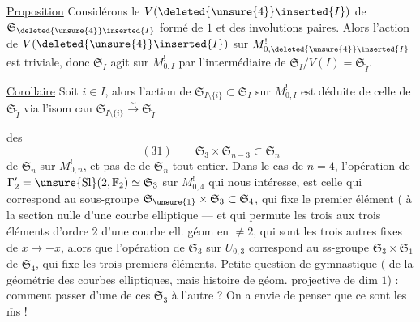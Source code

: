 \uline{Proposition} Considérons le 
$V(\deleted{\unsure{4}}\inserted{I})$ de $\mathfrak{S}_{\deleted{\unsure{4}}\inserted{I}}$ formé de $1$ et des involutions
paires. Alors l'action de $V(\deleted{\unsure{4}}\inserted{I})$ sur $M_{0,\deleted{\unsure{4}}\inserted{I}}^{!}$
est triviale,  donc  $\mathfrak{S}_I$ agit
sur $M_{0,I}^{!}$ par l'intermédiaire de
$\mathfrak{S}_I/V(I)=\mathfrak{S}_{\widetilde I}$.
\figure{[Trait vertical à gauche de la proposition, de $V(I)$ jusqu'à $\mathfrak{S}_I/V(I)=\mathfrak{S}_{\widetilde I}$.]}


\uline{Corollaire} Soit $i\in I$, alors l'action
de $\mathfrak{S}_{I\setminus\{i\}}\subset\mathfrak{S}_I$ sur $M_{0,I}^{!}$ est déduite
de celle de $\mathfrak{S}_{\widetilde I}$ via l'isom can $\mathfrak{S}_{I\setminus\{i\}}\xrightarrow{\sim}\mathfrak{S}_{\widetilde I}$

 des 
\[
 (31)\qquad \mathfrak{S}_3\times\mathfrak{S}_{n-3}\subset\mathfrak{S}_n
\]
de $\mathfrak{S}_n$ sur $M_{0,n}^{!}$, et pas de  de
$\mathfrak{S}_n$ tout entier. Dans le cas de $n=4$,
l'opération de $\Gamma'_2=\unsure{\mathrm{Sl}}(2,\mathbb{F}_2)\simeq\mathfrak{S}_3$ sur
$M_{0,4}^{!}$ qui nous intéresse, est celle qui
correspond au sous-groupe $\mathfrak{S}_{\unsure{1}}\times\mathfrak{S}_3\subset\mathfrak{S}_4$,
qui fixe le premier élément ( à
la section nulle d'une courbe elliptique
---  et qui permute les trois 
 aux trois éléments d'ordre $2$
d'une courbe ell. géom en  $\ne 2$, qui
sont les trois autres  fixes de
$x\mapsto -x$, alors que l'opération  de
$\mathfrak{S}_3$ sur $U_{0,3}$ correspond au ss-groupe
$\mathfrak{S}_3\times\mathfrak{S}_1$ de $\mathfrak{S}_4$, qui fixe les trois premiers
éléments. Petite question de gymnastique
 (  de la
géométrie des courbes elliptiques, mais
histoire de géom. projective de dim $1$) :
comment passer d'une de ces 
$\mathfrak{S}_3$ à l'autre ? On a envie de penser que
ce sont les $\overline{\mathrm m}$s !


